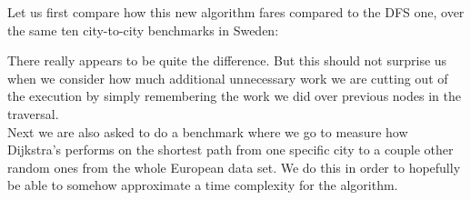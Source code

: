 \documentclass[a4paper,11pt]{article}
\begin{document}
Let us first compare how this new algorithm fares compared to the DFS one, over the same ten city-to-city benchmarks in Sweden:


\mydata


There really appears to be quite the difference. But this should not surprise us when we consider how much additional unnecessary work we are cutting out of the execution by simply remembering the work we did over previous nodes in the traversal.
\\

Next we are also asked to do a benchmark where we go to measure how Dijkstra's performs on the shortest path from one specific city to a couple other random ones from the whole European data set. We do this in order to hopefully be able to somehow approximate a time complexity for the algorithm.
\end{document}
